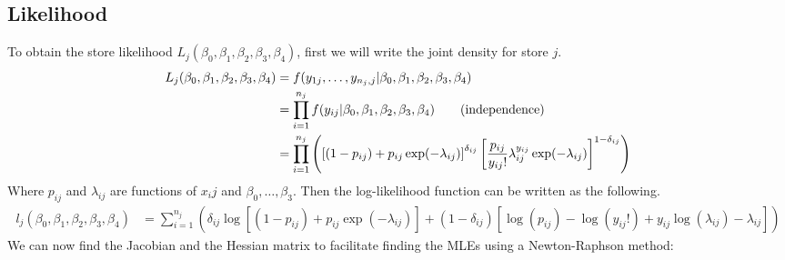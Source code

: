 \documentclass{article}\usepackage[]{graphicx}\usepackage[]{color}
\theoremstyle{plain}
\begin{document}
\subsection*{Likelihood}
To obtain the store likelihood $L_j(\beta_0, \beta_1, \beta_2, \beta_3, \beta_4)$, first we will write the joint density for store $j$.
\begin{align*}
L_j(\beta_0, \beta_1, \beta_2, \beta_3, \beta_4) &= f(y_{1j}, \dots, y_{{n_j},j} | \beta_0, \beta_1, \beta_2, \beta_3, \beta_4) \\
&= \prod\limits_{i=1}^{n_j} f(y_{ij}|\beta_0, \beta_1, \beta_2, \beta_3, \beta_4) \tag{\text{independence}} \\
&= \prod\limits_{i=1}^{n_j} \left(\left[(1-p_{ij}) + p_{ij} \exp(-\lambda_{ij})\right]^{\delta_{ij}} \left[ \frac{p_{ij}}{y_{ij} !} \lambda_{ij}^{y_{ij}}\exp(-\lambda_{ij}) \right] ^{1-\delta_{ij}} \right)
\end{align*}
Where $p_{ij}$ and $\lambda_{ij}$ are functions of $x_ij$ and $\beta_0, \dots, \beta_3$. Then the log-likelihood function can be written as the following.
\begin{align*}
l_j(\beta_0, \beta_1, \beta_2, \beta_3, \beta_4) &= \sum\limits_{i=1}^{n_j} \left(\delta_{ij} \log\left[(1-p_{ij}) + p_{ij} \exp(-\lambda_{ij})\right] + (1-\delta_{ij}) \left[ \log (p_{ij}) - \log(y_{ij} !) + y_{ij}\log(\lambda_{ij})-\lambda_{ij} \right] \right)
\end{align*}
We can now find the Jacobian and the Hessian matrix to facilitate finding the MLEs using a Newton-Raphson method:
\end{document}
